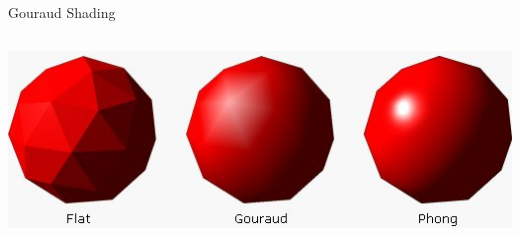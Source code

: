\begin{frame}{Gouraud Shading}
\begin{columns}
\begin{column}{0.4\textwidth}
\begin{tikzpicture}[scale=0.6]
      \end{tikzpicture}

      \vspace{0.5cm}

      \begin{center}
        \includegraphics[width=\textwidth]{images/shading.jpg}
      \end{center}
    \end{column}
  \end{columns}
\end{frame}